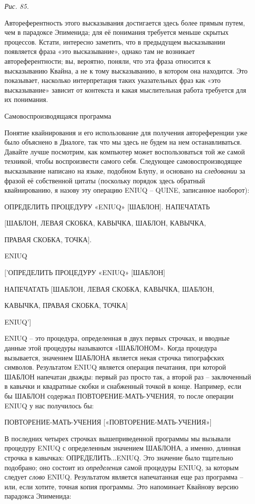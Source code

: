 \documentclass[../main.tex]{subfiles}
\begin{document}
\emph{Рис. 85.}

Автореферентность этого высказывания достигается здесь более прямым путем, чем в парадоксе Эпименида; для её понимания требуется меньше скрытых процессов. Кстати, интересно заметить, что в предыдущем высказывании появляется фраза «это высказывание», однако там не возникает автореферентности; вы, вероятно, поняли, что эта фраза относится к высказыванию Квайна, а не к тому высказыванию, в котором она находится. Это показывает, насколько интерпретация таких указательных фраз как «это высказывание» зависит от контекста и какая мыслительная работа требуется для их понимания.

Самовоспроизводящаяся программа

Понятие квайнирования и его использование для получения автореференции уже было объяснено в Диалоге, так что мы здесь не будем на нем останавливаться. Давайте лучше посмотрим, как компьютер может воспользоваться той же самой техникой, чтобы воспроизвести самого себя. Следующее самовоспроизводящее высказывание написано на языке, подобном Блупу, и основано на \emph{следовании} за фразой её собственной цитаты (поскольку порядок здесь обратный квайнированию, я назову эту операцию ENIUQ \--- QUINE, записанное наоборот):

ОПРЕДЕЛИТЬ ПРОЦЕДУРУ «ENIUQ» {[}ШАБЛОН{]}. НАПЕЧАТАТЬ

{[}ШАБЛОН, ЛЕВАЯ СКОБКА, КАВЫЧКА, ШАБЛОН, КАВЫЧКА,

ПРАВАЯ СКОБКА, ТОЧКА{]}.

ENIUQ

{[}'ОПРЕДЕЛИТЬ ПРОЦЕДУРУ «ENIUQ» {[}ШАБЛОН{]}

НАПЕЧАТАТЬ {[}ШАБЛОН, ЛЕВАЯ СКОБКА, КАВЫЧКА, ШАБЛОН,

КАВЫЧКА, ПРАВАЯ СКОБКА, ТОЧКА{]}

ENIUQ'{]}

ENIUQ \--- это процедура, определенная в двух первых строчках, и вводные данные этой процедуры называются «ШАБЛОНОМ». Когда процедура вызывается, значением ШАБЛОНА является некая строчка типографских символов. Результатом ENIUQ является операция печатания, при которой ШАБЛОН напечатан дважды: первый раз просто так, а второй раз \--- заключенный в кавычки и квадратные скобки и снабженный точкой в конце. Например, если бы ШАБЛОН содержал ПОВТОРЕНИЕ-МАТЬ-УЧЕНИЯ, то после операции ENIUQ у нас получилось бы:

ПОВТОРЕНИЕ-МАТЬ-УЧЕНИЯ {[}«ПОВТОРЕНИЕ-МАТЬ-УЧЕНИЯ»{]}

В последних четырех строчках вышеприведенной программы мы вызывали процедуру ENIUQ с определенным значением ШАБЛОНА, а именно, длинная строчка в кавычках: ОПРЕДЕЛИТЬ...ENIUQ. Это значение было тщательно подобрано; оно состоит из \emph{определения} самой процедуры ENIUQ, за которым следует \emph{слово} ENIUQ. Результатом является напечатанная еще раз программа \--- или, если хотите, точная копия программы. Это напоминает Квайнову версию парадокса Эпименида:
\end{document}
